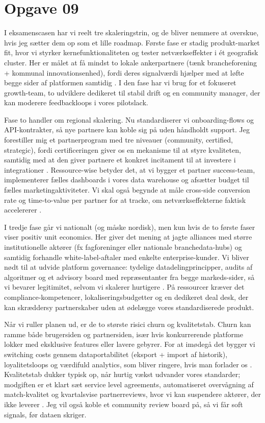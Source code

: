 \section*{Opgave 09}

I eksamenscasen har vi reelt tre skaleringstrin, og de bliver nemmere at overskue, hvis jeg sætter dem op som et lille roadmap. Første fase er stadig produkt-market fit, hvor vi styrker kernefunktionaliteten og tester netværkseffekter i ét geografisk cluster. Her er målet at få mindst to lokale ankerpartnere (tænk brancheforening + kommunal innovationsenhed), fordi deres signalværdi hjælper med at løfte begge sider af platformen samtidig \citep{Choudary2016,Reillier2017}. I den fase har vi brug for et fokuseret growth-team, to udviklere dedikeret til stabil drift og en community manager, der kan moderere feedbackloops i vores pilotslack.

Fase to handler om regional skalering. Nu standardiserer vi onboarding-flows og API-kontrakter, så nye partnere kan koble sig på uden håndholdt support. Jeg forestiller mig et partnerprogram med tre niveauer (community, certified, strategic), fordi certificeringen giver os en mekanisme til at styre kvaliteten, samtidig med at den giver partnere et konkret incitament til at investere i integrationer \citep{HagiuWright2013}. Ressource-wise betyder det, at vi bygger et partner success-team, implementerer fælles dashboards i vores data warehouse og afsætter budget til fælles marketingaktiviteter. Vi skal også begynde at måle cross-side conversion rate og time-to-value per partner for at tracke, om netværkseffekterne faktisk accelererer \citep{ShapiroVarian1999}.

I tredje fase går vi nationalt (og måske nordisk), men kun hvis de to første faser viser positiv unit economics. Her giver det mening at jagte alliances med større institutionelle aktører (fx fagforeninger eller nationale branchedata-hubs) og samtidig forhandle white-label-aftaler med enkelte enterprise-kunder. Vi bliver nødt til at udvide platform governance: tydelige datadelingprincipper, audits af algoritmer og et advisory board med repræsentanter fra begge markeds-sider, så vi bevarer legitimitet, selvom vi skalerer hurtigere \citep{Srnicek2017,Zuboff2019}. På ressourcer kræver det compliance-kompetencer, lokaliseringsbudgetter og en dedikeret deal desk, der kan skræddersy partnerskaber uden at ødelægge vores standardiserede produkt.

Når vi ruller planen ud, er de to største risici churn og kvalitetstab. Churn kan ramme både brugersiden og partnersiden, især hvis konkurrerende platforme lokker med eksklusive features eller lavere gebyrer. For at imødegå det bygger vi switching costs gennem dataportabilitet (eksport + import af historik), loyalitetsloops og værdifuld analytics, som bliver ringere, hvis man forlader os \citep{FarrellSaloner1986,ShapiroVarian1999}. Kvalitetstab dukker typisk op, når hurtig vækst udvander vores standarder; modgiften er et klart sæt service level agreements, automatiseret overvågning af match-kvalitet og kvartalsvise partnerreviews, hvor vi kan suspendere aktører, der ikke leverer \citep{Reillier2017}. Jeg vil også koble et community review board på, så vi får soft signals, før dataen skriger.

